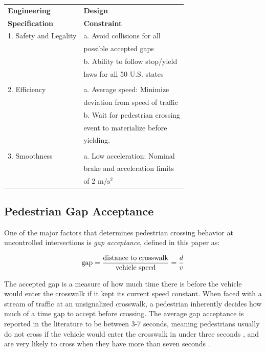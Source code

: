 \documentclass[letterpaper, 10 pt, conference]{ieeeconf} %
\begin{document}
\begin{center}
\begin{tabular}{ l| l }
\label{tb:specs}
 \textbf{Engineering} & \textbf{Design} \\
 \textbf{Specification\cite{Thornton2018}} & \textbf{Constraint}\\\hline 
 1. Safety and Legality & a. Avoid collisions for all\\
           & possible accepted gaps            \\
           &b. Ability to follow stop/yield  \\
           &laws for all 50 U.S. states\\
           
&\\
 2. Efficiency & a. Average speed: Minimize \\ 
        & deviation from speed of traffic \\  
        & b. Wait for pedestrian crossing \\
        & event to materialize before \\
        & yielding. \\ 

        & \\
 3. Smoothness & a. Low acceleration: Nominal \\ 
 			  & brake and acceleration limits \\
 			  & of 2 $\mathrm{m/s^2}$ \\


\end{tabular}
\end{center}

\subsection{Pedestrian Gap Acceptance}

One of the major factors that determines pedestrian crossing behavior at uncontrolled intersections is \textit{gap acceptance}, defined in this paper as:

\begin{equation}
\mathrm{gap} = \frac{\mathrm{distance\hspace{1mm}to\hspace{1mm}crosswalk}}{\mathrm{vehicle\hspace{1mm}speed}} = \frac{d}{v}
\end{equation} 

The accepted gap is a measure of how much time there is before the vehicle would enter the crosswalk if it kept its current speed constant. When faced with a stream of traffic at an unsignalized crosswalk, a pedestrian inherently decides how much of a time gap to accept before crossing. The average gap acceptance is reported in the literature to be between 3-7 seconds, meaning pedestrians usually do not cross if the vehicle would enter the crosswalk in under three seconds \cite{DiPietroCharlesMandKing1970}, and are very likely to cross when they have more than seven seconds \cite{Schmidt2009}. 
\end{document}
